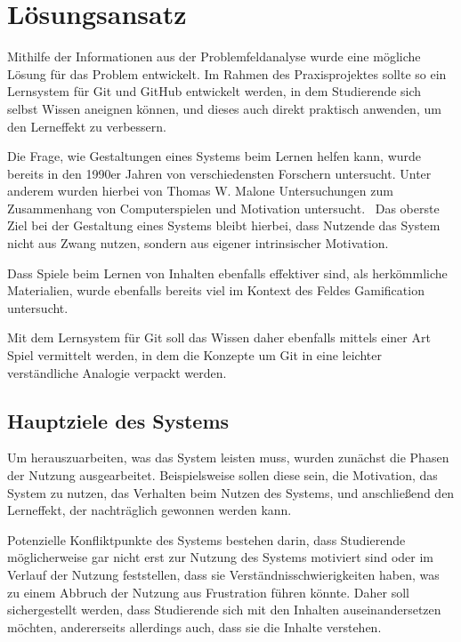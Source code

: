 \chapter{Lösungsansatz}
\label{chap:Textsatz}
Mithilfe der Informationen aus der Problemfeldanalyse wurde eine mögliche Lösung für das Problem entwickelt. 
Im Rahmen des Praxisprojektes sollte so ein Lernsystem für Git und GitHub entwickelt werden, in dem Studierende 
sich selbst Wissen aneignen können, und dieses auch direkt praktisch anwenden, um den Lerneffekt zu verbessern.
\par
Die Frage, wie Gestaltungen eines Systems beim Lernen helfen kann, wurde bereits in den 1990er Jahren von verschiedensten
Forschern untersucht. 
Unter anderem wurden hierbei von Thomas W. Malone Untersuchungen zum Zusammenhang von Computerspielen
und Motivation untersucht.~\cite{malone:tex}
Das oberste Ziel bei der Gestaltung eines Systems bleibt hierbei, dass Nutzende das System nicht aus Zwang nutzen,
sondern aus eigener intrinsischer Motivation.

\par
Dass Spiele beim Lernen von Inhalten ebenfalls effektiver sind, als herkömmliche Materialien, wurde ebenfalls bereits
viel im Kontext des Feldes Gamification untersucht.

\par
Mit dem Lernsystem für Git soll das Wissen daher ebenfalls mittels einer Art Spiel vermittelt werden, in dem die 
Konzepte um Git in eine leichter verständliche Analogie verpackt werden.

\section{Hauptziele des Systems}

Um herauszuarbeiten, was das System leisten muss, wurden zunächst die Phasen der Nutzung ausgearbeitet.
Beispielsweise sollen diese sein, die Motivation, das System zu nutzen, das Verhalten beim Nutzen des Systems,
und anschließend den Lerneffekt, der nachträglich gewonnen werden kann.

Potenzielle Konfliktpunkte des Systems bestehen darin, dass Studierende möglicherweise gar nicht erst zur Nutzung des Systems 
motiviert sind oder im Verlauf der Nutzung feststellen, dass sie Verständnisschwierigkeiten haben, was zu einem 
Abbruch der Nutzung aus Frustration führen könnte.
Daher soll sichergestellt werden, dass Studierende sich mit den Inhalten auseinandersetzen möchten,
andererseits allerdings auch, dass sie die Inhalte verstehen.

